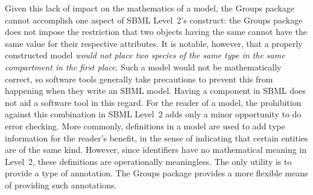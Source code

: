 Given this lack of impact on the mathematics of a model, the Groups package cannot accomplish one aspect of SBML Level~2's \SpeciesType construct: the Groups package does not impose the restriction that two \Species objects having the same \SpeciesType cannot have the same value for their respective  attributes.  It is notable, however, that a properly constructed model \emph{would not place two species of the same type in the same compartment in the first place}.  Such a model would not be mathematically correct, so software tools generally take precautions to prevent this from happening when they write an SBML model.  Having a \SpeciesType component in SBML does not aid a software tool in this regard.  For the reader of a model, the prohibition against this combination in SBML Level~2 adds only a minor opportunity to do error checking.  More commonly, \SpeciesType definitions in a model are used to add type information for the reader's benefit, in the sense of indicating that certain entities are of the same kind.  However, since \SpeciesType identifiers have no mathematical meaning in Level~2, these definitions are operationally meaningless.  The only utility is to provide a type of annotation.  The Groups package provides a more flexible means of providing such annotations.

